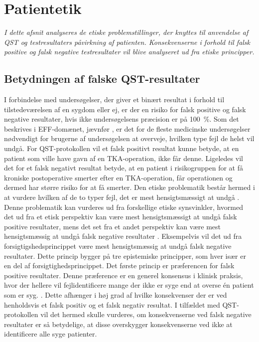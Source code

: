 \section{Patientetik}
\textit{I dette afsnit analyseres de etiske problemstillinger, der knyttes til anvendelse af QST og testresultaters påvirkning af patienten. Konsekvenserne i forhold til falsk positive og falsk negative testresultater vil blive analyseret ud fra etiske principper.}

\subsection{Betydningen af falske QST-resultater}
I forbindelse med undersøgelser, der giver et binært resultat i forhold til tilstedeværelsen af en sygdom eller ej, er der en risiko for falsk positive og falsk negative resultater, hvis ikke undersøgelsens præcision er på 100~\%. Som det beskrives i EFF-domænet, jævnfør , er det for de fleste medicinske undersøgelser nødvendigt for brugerne af undersøgelsen at overveje, hvilken type fejl de helst vil undgå. For QST-protokollen vil et falsk positivt resultat kunne betyde, at en patient som ville have gavn af en TKA-operation, ikke får denne. Ligeledes vil det for et falsk negativt resultat betyde, at en patient i risikogruppen for at få kroniske postoperative smerter efter en TKA-operation, får operationen og dermed har større risiko for at få smerter. Den etiske problematik består hermed i at vurdere hvilken af de to typer fejl, det er mest hensigtsmæssigt at undgå \citep{Kraemer2011}. \\
Denne problematik kan vurderes ud fra forskellige etiske synsvinkler, hvormed det ud fra et etisk perspektiv kan være mest hensigtsmæssigt at undgå falsk positive resultater, mens det set fra et andet perspektiv kan være mest hensigtsmæssig at undgå falsk negative resultater \citep{Kraemer2011}. Eksempelvis vil det ud fra forsigtigshedsprincippet være mest hensigtsmæssig at undgå falsk negative resultater. Dette princip bygger på tre epistemiske principper, som hver især er en del af forsigtighedsprincippet. \citep{Peterson2007} Det første princip er præferencen for falsk positive resultater. Denne præference er en generel konsensus i klinisk praksis, hvor der hellere vil fejlidentificere mange der ikke er syge end at overse én patient som er syg. \citep{Peterson2007}. Dette afhænger i høj grad af hvilke konsekvenser der er ved henholdsvis et falsk positiv og et falsk negativ resultat. I tilfældet med QST-protokollen vil det hermed skulle vurderes, om konsekvenserne ved falsk negative resultater er så betydelige, at disse overskygger konsekvenserne ved ikke at identificere alle syge patienter. \citep{Peterson2007} \\
